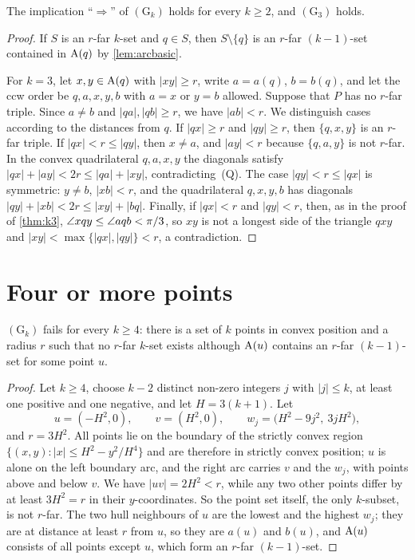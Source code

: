 \begin{proposition}\label{prop:g3}
The implication ``$\Rightarrow$'' of $(\mathrm{G}_k)$ holds for every
$k\ge2$, and $(\mathrm{G}_3)$ holds.
\end{proposition}
\begin{proof}
If $S$ is an $r$-far $k$-set and $q\in S$, then $S\setminus\{q\}$ is an
$r$-far $(k-1)$-set contained in $\mathrm{A}(q)$ by \cref{lem:arcbasic}.

For $k=3$, let $x,y\in\mathrm{A}(q)$ with $|xy|\ge r$, write $a=a(q)$, $b=b(q)$,
and let the ccw order be $q,a,x,y,b$ with $a=x$ or $y=b$ allowed. Suppose that
$P$ has no $r$-far triple. Since $a\ne b$ and $|qa|,|qb|\ge r$, we have
$|ab|<r$. We distinguish cases according to the distances from $q$.
If $|qx|\ge r$ and $|qy|\ge r$, then $\{q,x,y\}$ is an $r$-far triple.
If $|qx|<r\le|qy|$, then $x\ne a$, and $|ay|<r$ because $\{q,a,y\}$ is not
$r$-far. In the convex quadrilateral $q,a,x,y$ the diagonals satisfy
$|qx|+|ay|<2r\le|qa|+|xy|$, contradicting~(Q). The case $|qy|<r\le|qx|$ is
symmetric: $y\neq b$, $|xb|<r$, and the quadrilateral $q,x,y,b$ has diagonals
$|qy|+|xb|<2r\le|xy|+|bq|$. Finally, if $|qx|<r$ and $|qy|<r$, then, as in the
proof of \cref{thm:k3}, $\angle xqy\le\angle aqb<\pi/3$, so $xy$ is not a longest
side of the triangle $qxy$ and $|xy|<\max\{|qx|,|qy|\}<r$, a contradiction.
\end{proof}

\section{Four or more points}\label{sec:k4}

\begin{proposition}\label{prop:gk}
$(\mathrm{G}_k)$ fails for every $k\ge4$: there is a set of $k$ points in
convex position and a radius $r$ such that no $r$-far $k$-set exists although
$\mathrm{A}(u)$ contains an $r$-far $(k-1)$-set for some point $u$.
\end{proposition}
\begin{proof}
Let $k\ge4$, choose $k-2$ distinct non-zero integers $j$ with $|j|\le k$, at
least one positive and one negative, and let $H=3(k+1)$. Let
\[
u=(-H^2,0),\qquad v=(H^2,0),\qquad w_j=\bigl(H^2-9j^2,\ 3jH^2\bigr),
\]
and $r=3H^2$. All points lie on the boundary of the strictly convex region
$\{(x,y):|x|\le H^2-y^2/H^4\}$ and are therefore in strictly convex position;
$u$ is alone on the left boundary arc, and the right arc carries $v$ and the
$w_j$, with points above and below $v$. We have $|uv|=2H^2<r$, while any two
other points differ by at least $3H^2=r$ in their $y$-coordinates. So the
point set itself, the only $k$-subset, is not $r$-far. The two hull neighbours
of $u$ are the lowest and the highest $w_j$; they are at distance at least
$r$ from $u$, so they are $a(u)$ and $b(u)$, and $\mathrm{A}(u)$ consists of all
points except $u$, which form an $r$-far $(k-1)$-set.
\end{proof}

